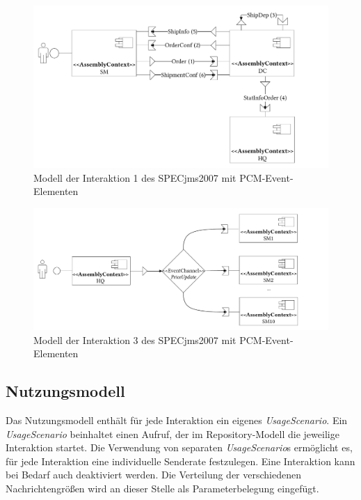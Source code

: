 \begin{figure}
\center
  \includegraphics[width=1\textwidth]{images/evaluation/specjms/evaluationInteraktion1events.pdf}
  \caption{Modell der Interaktion 1 des SPECjms2007 mit PCM-Event-Elementen}
  \label{img:interaction1system}
\end{figure}

\begin{figure}
\center
  \includegraphics[width=1\textwidth]{images/evaluation/specjms/evaluationInteraktion3events.pdf}
  \caption{Modell der Interaktion 3 des SPECjms2007 mit PCM-Event-Elementen}
  \label{img:interaction3system}
\end{figure}


\subsection{Nutzungsmodell}
Das Nutzungsmodell enthält für jede Interaktion ein eigenes \emph{UsageScenario}. Ein \emph{UsageScenario} beinhaltet einen Aufruf, der im Repository-Modell die jeweilige Interaktion startet. Die Verwendung von separaten \emph{UsageScenario}s ermöglicht es, für jede Interaktion eine individuelle Senderate festzulegen. Eine Interaktion kann bei Bedarf auch deaktiviert werden. Die Verteilung der verschiedenen Nachrichtengrößen wird an dieser Stelle als Parameterbelegung eingefügt.

